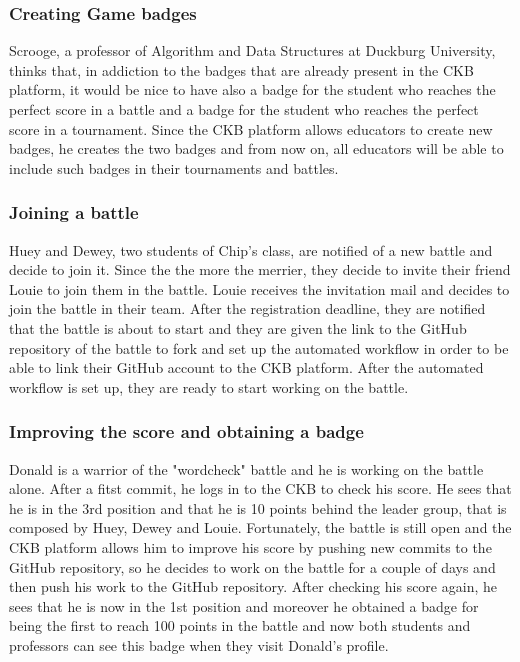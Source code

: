 \subsubsection{Creating Game badges}
Scrooge, a professor of Algorithm and Data Structures at Duckburg University, thinks that, in addiction to the badges that are already present in the CKB platform, it would be nice to have also a badge for the student who reaches the perfect score in a battle and a badge for the student who reaches the perfect score in a tournament.
Since the CKB platform allows educators to create new badges, he creates the two badges and from now on, all educators will be able to include such badges in their tournaments and battles.

\subsubsection{Joining a battle}
Huey and Dewey, two students of Chip's class, are notified of a new battle and decide to join it.
Since the the more the merrier, they decide to invite their friend Louie to join them in the battle.
Louie receives the invitation mail and decides to join the battle in their team.
After the registration deadline, they are notified that the battle is about to start and they are given the link to the GitHub repository of the battle to fork and set up the automated workflow in order to be able to link their GitHub account to the CKB platform.
After the automated workflow is set up, they are ready to start working on the battle.

\subsubsection{Improving the score and obtaining a badge}
Donald is a warrior of the "wordcheck" battle and he is working on the battle alone.
After a fitst commit, he logs in to the CKB to check his score.
He sees that he is in the 3rd position and that he is 10 points behind the leader group, that is composed by Huey, Dewey and Louie.
Fortunately, the battle is still open and the CKB platform allows him to improve his score by pushing new commits to the GitHub repository, so he decides to work on the battle for a couple of days and then push his work to the GitHub repository.
After checking his score again, he sees that he is now in the 1st position and moreover he obtained a badge for being the first to reach 100 points in the battle and now both students and professors can see this badge when they visit Donald's profile.

